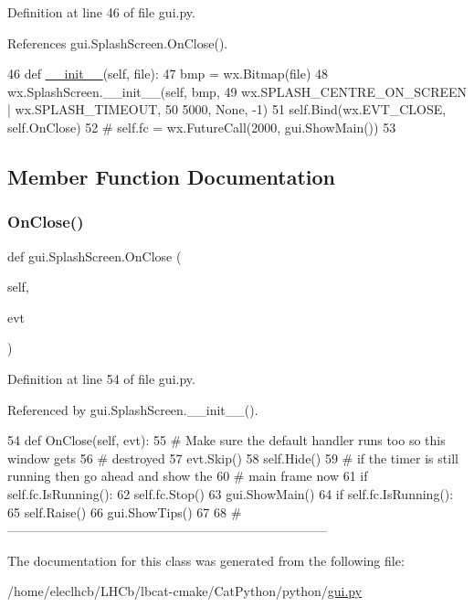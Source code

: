 Definition at line 46 of file gui.\+py.



References gui.\+Splash\+Screen.\+On\+Close().


\begin{DoxyCode}
46     \textcolor{keyword}{def }\hyperlink{classwrapper_1_1ModuleDictWrapper_a9a7a794150502f51df687831583e13b9}{\_\_init\_\_}(self, file):
47         bmp = wx.Bitmap(file)
48         wx.SplashScreen.\_\_init\_\_(self, bmp,
49                                  wx.SPLASH\_CENTRE\_ON\_SCREEN | wx.SPLASH\_TIMEOUT,
50                                  5000, \textcolor{keywordtype}{None}, -1)
51         self.Bind(wx.EVT\_CLOSE, self.OnClose)
52         \textcolor{comment}{#        self.fc = wx.FutureCall(2000, gui.ShowMain())}
53 
\end{DoxyCode}


\subsection{Member Function Documentation}
\mbox{\label{classgui_1_1SplashScreen_a2688263042c784a3d7cb7947fabe0edb}} 
\subsubsection{\texorpdfstring{On\+Close()}{OnClose()}}
{\footnotesize\ttfamily def gui.\+Splash\+Screen.\+On\+Close (\begin{DoxyParamCaption}\item[{}]{self,  }\item[{}]{evt }\end{DoxyParamCaption})}



Definition at line 54 of file gui.\+py.



Referenced by gui.\+Splash\+Screen.\+\_\+\+\_\+init\+\_\+\+\_\+().


\begin{DoxyCode}
54     \textcolor{keyword}{def }OnClose(self, evt):
55         \textcolor{comment}{# Make sure the default handler runs too so this window gets}
56         \textcolor{comment}{# destroyed}
57         evt.Skip()
58         self.Hide()
59         \textcolor{comment}{# if the timer is still running then go ahead and show the}
60         \textcolor{comment}{# main frame now}
61         \textcolor{keywordflow}{if} self.fc.IsRunning():
62             self.fc.Stop()
63             gui.ShowMain()
64             \textcolor{keywordflow}{if} self.fc.IsRunning():
65                 self.Raise()
66             gui.ShowTips()
67             
68 \textcolor{comment}{#---------------------------------------------------------------------------}
\end{DoxyCode}


The documentation for this class was generated from the following file\+:\begin{DoxyCompactItemize}
\item 
/home/eleclhcb/\+L\+H\+Cb/lbcat-\/cmake/\+Cat\+Python/python/\hyperlink{gui_8py}{gui.\+py}\end{DoxyCompactItemize}
